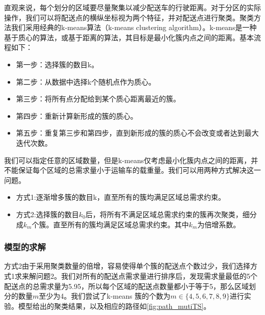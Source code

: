 \documentclass{cumcmthesis}
\begin{document}
    直观来说，每个划分的区域要尽量聚集以减少配送车的行驶距离。对于分区的实际操作，我们可以将配送点的横纵坐标视为两个特征，并对配送点进行聚类。聚类方法我们采用经典的k-means算法（k-means clustering algorithm）。k-means是一种基于质心的算法，或基于距离的算法，其目标是最小化簇内点之间的距离。基本流程如下：
    \begin{itemize}
        \item {第一步：选择簇的数目k。}
        \item {第二步：从数据中选择k个随机点作为质心。}
        \item {第三步：将所有点分配给到某个质心距离最近的簇。}
        \item {第四步：重新计算新形成的簇的质心。}
        \item {第五步：重复第三步和第四步，直到新形成的簇的质心不会改变或者达到最大迭代次数。}
    \end{itemize}
    我们可以指定任意的区域数量，但是k-means仅考虑最小化簇内点之间的距离，并不能保证每个区域的总需求量小于运输车的载重量。我们可以用两种方式解决这一问题。
    \begin{itemize}
        \item {方式1:逐渐增多簇的数目k，直至所有的簇均满足区域总需求约束。}
        \item {方式2:选择簇的数目$k_0$后，将所有不满足区域总需求约束的簇再次聚类，细分成$k_m$个簇。直至所有的簇均满足区域总需求约束。其中$k_m$为倍增系数。}
        \end{itemize}

    \subsubsection{模型的求解}
    方式2由于采用聚类数量的倍增，容易使得单个簇的配送点个数过少，我们选择方式1求来解问题2。我们对所有的配送点需求量进行排序后，发现需求量最低的5个配送点的总需求量为5.95，所以每个区域的配送点数量都小于等于5，那么区域划分的数量$m$至少为4。我们尝试了k-means 簇的个数为$m\in\{4,5,6,7,8,9\}$进行实验。模型给出的聚类结果，以及相应的路径如\cref{fig:path_mutiTS}。
\end{document}
